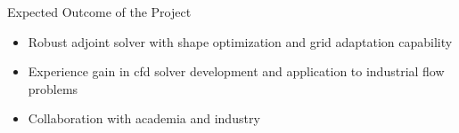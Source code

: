 \begin{frame}{Expected Outcome of the Project}
\begin{block}{}
\begin{itemize}
\item Robust adjoint solver with shape optimization and grid adaptation capability
\item Experience gain in cfd solver development and application to industrial flow problems
\item Collaboration with academia and industry

\end{itemize}
\end{block}
\end{frame}

%

